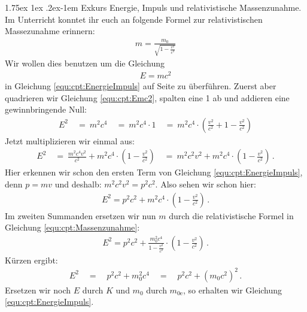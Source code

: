 \documentclass[a4paper, 10pt]{scrbook}
\makeatletter
\renewcommand{\paragraph}{%
  \@startsection{paragraph}{4}%
  {\z@}{1.75ex \@plus 1ex \@minus .2ex}{-1em}%
  {\sffamily\small\bfseries}%
}
\newcommand\el{\text{e}}
\makeatother
\begin{document}
\paragraph{Exkurs Energie, Impuls und relativistische Massenzunahme.}
\label{sec:cpt:relativity}
Im Unterricht konntet ihr euch an folgende Formel zur relativistischen Massezunahme erinnern:
\begin{align}
  m = \frac{m_0}{\sqrt{1 - \frac{v^2}{c^2}}}
  \label{equ:cpt:Massenzunahme}
\end{align}
Wir wollen dies benutzen um die Gleichung
\begin{align}
  E = mc^2
  \label{equ:cpt:Emc2}
\end{align}
in Gleichung \eqref{equ:cpt:EnergieImpuls} auf Seite \pageref{equ:cpt:EnergieImpuls} zu überführen.
Zuerst aber quadrieren wir Gleichung \eqref{equ:cpt:Emc2}, spalten eine 1 ab und addieren eine gewinnbringende Null:
\begin{align*}
  E^2 \quad=~ m^2 c^4 \quad=~ m^2 c^4 \cdot 1 \quad=~ m^2 c^4 \cdot \left( \frac{v^2}{c^2} + 1 - \frac{v^2}{c^2} \right)
\end{align*}
Jetzt multiplizieren wir einmal aus:
\begin{align*}
 E^2 \quad=~ \frac{m^2 c^4 v^2}{c^2} + m^2 c^4 \cdot \left( 1 - \frac{v^2}{c^2} \right)
 \quad=~ m^2 c^2 v^2 + m^2 c^4 \cdot \left( 1 - \frac{v^2}{c^2} \right)\, .
\end{align*}
Hier erkennen wir schon den ersten Term von Gleichung \eqref{equ:cpt:EnergieImpuls}, denn $p = mv$ und deshalb: $m^2 c^2 v^2 = p^2 c^2$.
Also sehen wir schon hier:
\begin{align*}
 E^2 = p^2 c^2 + m^2 c^4 \cdot \left( 1 - \frac{v^2}{c^2} \right)\, .
\end{align*}
Im zweiten Summanden ersetzen wir nun $m$ durch die relativistische Formel in Gleichung \eqref{equ:cpt:Massenzunahme}:
\begin{align*}
 E^2 = p^2 c^2 + \frac{m_{0}^2 c^4}{1 - \frac{v^2}{c^2}} \cdot \left( 1 - \frac{v^2}{c^2} \right)\, .
\end{align*}
Kürzen ergibt:
\begin{align}
 E^2 \quad=\quad p^2 c^2 + m_{0}^2 c^4 \quad=\quad p^2 c^2 + \left( m_{0} c^2 \right)^2 \, .
\end{align}
Ersetzen wir noch $E$ durch $K$ und $m_0$ durch $m_{0\el}$, so erhalten wir Gleichung \eqref{equ:cpt:EnergieImpuls}.
\end{document}
